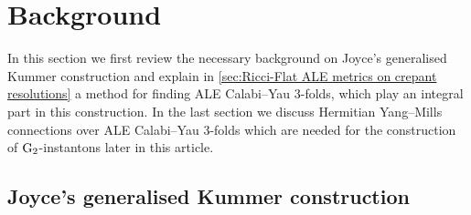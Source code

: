 \documentclass[11pt,a4paper]{scrartcl}
\newcommand{\G}{\textup{G}}
\numberwithin{equation}{section}
\theoremstyle{plain}
\theoremstyle{definition}
\theoremstyle{remark}
\begin{document}
\section{Background} \label{sec: Background}

In this section we first review the necessary background on Joyce's generalised Kummer construction and explain in \autoref{sec:Ricci-Flat ALE metrics on crepant resolutions} a method for finding ALE Calabi--Yau 3-folds, which play an integral part in this construction. In the last section we discuss Hermitian Yang--Mills connections over ALE Calabi--Yau 3-folds which are needed for the construction of $\G_2$-instantons later in this article.

\subsection{Joyce's generalised Kummer construction}\label{Sec:generalisedKummer}
\end{document}
